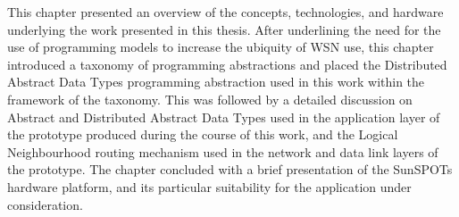 This chapter presented an overview of the concepts, technologies, and hardware
underlying the work presented in this thesis. After underlining the need for the
use of programming models to increase the ubiquity of WSN use, this chapter
introduced a taxonomy of programming abstractions and placed the Distributed
Abstract Data Types programming abstraction used in this work within the
framework of the taxonomy. This was followed by a detailed discussion on Abstract
and Distributed Abstract Data Types used in the application layer of the
prototype produced during the course of this work, and the Logical Neighbourhood
routing mechanism used in the network and data link layers of the prototype. The
chapter concluded with a brief presentation of the SunSPOTs hardware platform,
and its particular suitability for the application under consideration. 


  